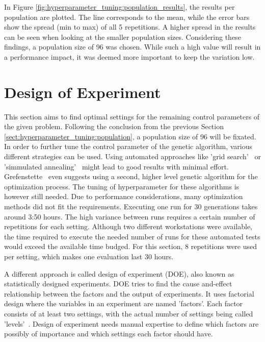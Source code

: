 In Figure \ref{fig:hyperparameter_tuning:population_results}, the results per population are plotted. The line corresponds to the mean, while the error bars show the spread (min to max) of all 5 repetitions. A higher spread in the results can be seen when looking at the smaller population sizes. Considering these findings, a population size of 96 was chosen. While such a high value will result in a performance impact, it was deemed more important to keep the variation low.

\section{Design of Experiment}
\label{sect:hyperparameter_tuning:design_of_experiment}
This section aims to find optimal settings for the remaining control parameters of the given problem. Following the conclusion from the previous Section \ref{sect:hyperparameter_tuning:population}, a population size of 96 will be fixated. In order to further tune the control parameter of the genetic algorithm, various different strategies can be used. Using automated approaches like 'grid search'~\cite{zahedi_search_2021} or 'simmulated annealing'~\cite{kirkpatrick_optimization_1983} might lead to good results with minimal effort. Grefenstette~\cite{grefenstette_optimization_1986} even suggests using a second, higher level genetic algorithm for the optimization process. The tuning of hyperparameter for these algorithms is however still needed. Due to performance considerations, many optimization methods did not fit the requirements. Executing one run for 30 generations takes around 3:50 hours. The high variance between runs requires a certain number of repetitions for each setting. Although two different workstations were available, the time required to execute the needed number of runs for these automated tests would exceed the available time budged. For this section, 8 repetitions were used per setting, which makes one evaluation last 30 hours.

A different approach is called design of experiment (DOE), also known as statistically designed experiments. DOE tries to find the cause and-effect relationship between the factors and the output of experiments. It uses factorial design where the variables in an experiment are named 'factors'. Each factor consists of at least two settings, with the actual number of settings being called 'levels'~\cite{yang_design_2009}. Design of experiment needs manual expertise to define which factors are possibly of importance and which settings each factor should have.

